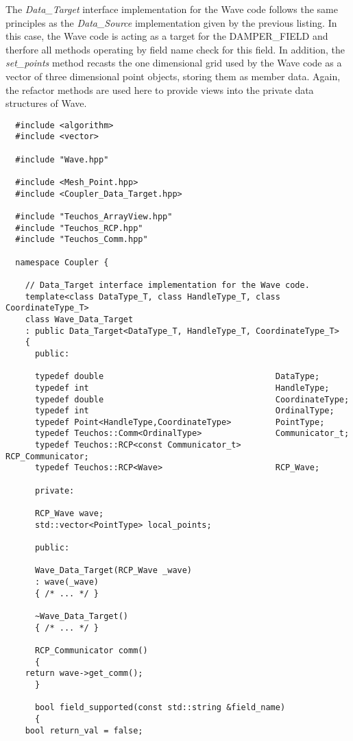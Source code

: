 \documentclass[letterpaper]{article}
\begin{document}
The {\sl Data\_Target} interface implementation for the Wave code
follows the same principles as the {\sl Data\_Source} implementation
given by the previous listing. In this case, the Wave code is acting
as a target for the DAMPER\_FIELD and therfore all methods operating
by field name check for this field. In addition, the {\sl set\_points}
method recasts the one dimensional grid used by the Wave code as a
vector of three dimensional point objects, storing them as member
data. Again, the refactor methods are used here to provide views into
the private data structures of Wave.

\begin{lstlisting}
  #include <algorithm>
  #include <vector>

  #include "Wave.hpp"

  #include <Mesh_Point.hpp>
  #include <Coupler_Data_Target.hpp>

  #include "Teuchos_ArrayView.hpp"
  #include "Teuchos_RCP.hpp"
  #include "Teuchos_Comm.hpp"

  namespace Coupler {

    // Data_Target interface implementation for the Wave code.
    template<class DataType_T, class HandleType_T, class CoordinateType_T>
    class Wave_Data_Target 
    : public Data_Target<DataType_T, HandleType_T, CoordinateType_T>
    {
      public:

      typedef double                                   DataType;
      typedef int                                      HandleType;
      typedef double                                   CoordinateType;
      typedef int                                      OrdinalType;
      typedef Point<HandleType,CoordinateType>         PointType;
      typedef Teuchos::Comm<OrdinalType>               Communicator_t;
      typedef Teuchos::RCP<const Communicator_t>       RCP_Communicator;
      typedef Teuchos::RCP<Wave>                       RCP_Wave;

      private:

      RCP_Wave wave;
      std::vector<PointType> local_points;

      public:

      Wave_Data_Target(RCP_Wave _wave)
      : wave(_wave)
      { /* ... */ }

      ~Wave_Data_Target()
      { /* ... */ }

      RCP_Communicator comm()
      {
	return wave->get_comm();
      }

      bool field_supported(const std::string &field_name)
      {
	bool return_val = false;


\end{lstlisting}
\end{document}
